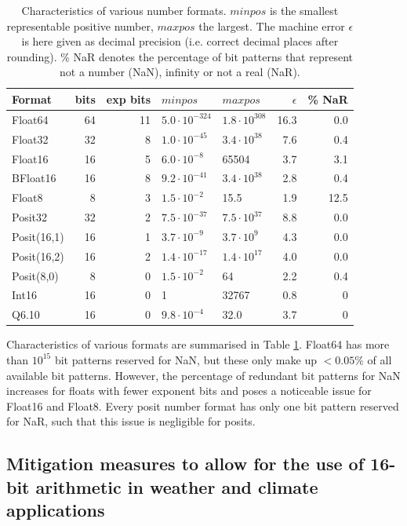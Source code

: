 \documentclass[draft]{agujournal2019}
\begin{document}
\begin{table}[htbp]
\center
\begin{tabular}{l | r | r | l | l | r | r}
Format & bits & exp bits & $minpos$ & $maxpos$ & $\epsilon$ &  \% NaR \\
\hline
Float64    & 64 & 11 & $5.0 \cdot 10^{-324}$ & $1.8 \cdot 10^{308}$  & 16.3 & 0.0 \\
Float32    & 32 & 8 & $1.0 \cdot 10^{-45}$ & $3.4 \cdot 10^{38}$ & 7.6 & 0.4 \\
Float16    & 16 & 5 & $6.0 \cdot 10^{-8}$ & 65504 & 3.7 & 3.1 \\
BFloat16    & 16 & 8 & $ 9.2 \cdot 10^{-41}$ & $3.4 \cdot 10^{38}$ & 2.8 & 0.4  \\
Float8 & 8 & 3 & $1.5 \cdot 10^{-2}$ & 15.5 & 1.9 &12.5\\
\hline
Posit32    & 32 & 2 &  $7.5 \cdot 10^{-37}$ & $7.5 \cdot 10^{37}$ & 8.8 & 0.0 \\
Posit(16,1) & 16 & 1 & $3.7 \cdot 10^{-9}$ & $3.7 \cdot 10^{9}$ & 4.3 & 0.0\\
Posit(16,2) & 16 & 2 & $1.4 \cdot 10^{-17}$ & $1.4 \cdot 10^{17}$ & 4.0 & 0.0\\
Posit(8,0) & 8 & 0 & $1.5 \cdot 10^{-2}$ & 64 & 2.2 & 0.4  \\
\hline
Int16 & 16 & 0 & 1 & 32767 & 0.8 & 0\\
Q6.10 & 16 & 0 & $9.8 \cdot 10^{-4}$ & 32.0 & 3.7 & 0
\end{tabular}
\vspace{10pt}
\caption{Characteristics of various number formats. $minpos$ is the smallest
representable positive number, $maxpos$ the largest. The machine error $\epsilon$
is here given as decimal precision (i.e. correct decimal places after rounding).
\% NaR denotes the percentage of bit patterns that represent not a number (NaN),
infinity or not a real (NaR).}
\label{tab:formats}
\end{table}

Characteristics of various formats are summarised in Table \ref{tab:formats}.
Float64 has more than $10^{15}$ bit patterns reserved for NaN, but these only
make up $< 0.05\%$ of all available bit patterns. However, the percentage of
redundant bit patterns for NaN increases for floats with fewer exponent bits
and poses a noticeable issue for Float16 and Float8. Every posit number format
has only one bit pattern reserved for NaR, such that this issue is negligible for
posits.

\subsection{Mitigation measures to allow for the use of 16-bit arithmetic in
weather and climate applications}
\end{document}

